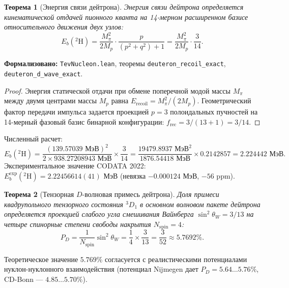\documentclass[11pt,a4paper]{article}
\newtheorem{theorem}{Теорема}
\theoremstyle{definition}
\theoremstyle{remark}
\begin{document}
\begin{theorem}[Энергия связи дейтрона]
\label{thm:deuteron_binding}
	Энергия связи дейтрона определяется кинематической отдачей пионного кванта на 14-мерном расширенном базисе относительного движения двух узлов:
\begin{equation}
	E_b(^2\mathrm{H}) = \frac{M_\pi^2}{2 M_p} \cdot \frac{p}{(p^2 + q^2) + 1} = \frac{M_\pi^2}{2 M_p} \cdot \frac{3}{14}.
\label{eq:deuteron_binding_exact}
\end{equation}
\end{theorem}

\noindent\small\textbf{Формализовано:} \texttt{TevNucleon.lean}, теоремы \texttt{deuteron_recoil_exact}, \texttt{deuteron_d_wave_exact}.

\begin{proof}
	Энергия статической отдачи при обмене поперечной модой массы $M_\pi$ между двумя центрами массы $M_p$ равна $E_{\mathrm{recoil}} = M_\pi^2 / (2 M_p)$. Геометрический фактор передачи импульса задается проекцией $p=3$ полоидальных пучностей на 14-мерный фазовый базис бинарной конфигурации: $f_{\mathrm{rec}} = 3 / (13 + 1) = 3/14$.
\end{proof}

Численный расчет:
\begin{equation}
	E_b(^2\mathrm{H}) = \frac{(139.57039\text{ МэВ})^2}{2 \times 938.27208943\text{ МэВ}} \times \frac{3}{14} = \frac{19479.8937\text{ МэВ}^2}{1876.54418\text{ МэВ}} \times 0.2142857 = 2.224442\text{ МэВ}.
	\label{eq:deuteron_binding_numerical}
\end{equation}
Экспериментальное значение CODATA 2022: $E_b^{\mathrm{exp}}(^2\mathrm{H}) = 2.22456614(41)\text{ МэВ}$ (невязка $-0.000124\text{ МэВ}$, $-56\text{ ppm}$).

\begin{theorem}[Тензорная $D$-волновая примесь дейтрона]
\label{thm:deuteron_d_wave}
	Доля примеси квадрупольного тензорного состояния $^3D_1$ в основном волновом пакете дейтрона определяется проекцией слабого угла смешивания Вайнберга $\sin^2\theta_W = 3/13$ на четыре спинорные степени свободы накрытия $N_{\mathrm{spin}} = 4$:
\begin{equation}
	P_D = \frac{1}{N_{\mathrm{spin}}} \sin^2\theta_W = \frac{1}{4} \times \frac{3}{13} = \frac{3}{52} \approx 5.7692\%.
\label{eq:deuteron_d_wave_formula}
\end{equation}
\end{theorem}
Теоретическое значение $5.769\%$ согласуется с реалистическими потенциалами нуклон-нуклонного взаимодействия (потенциал Nijmegen дает $P_D = 5.64\dots 5.76\%$, CD-Bonn — $4.85\dots 5.70\%$).
\end{document}
